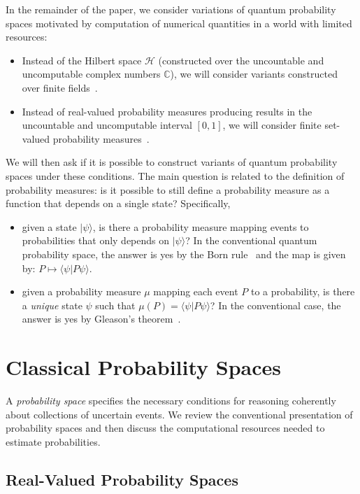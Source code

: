 \documentclass{article}
\theoremstyle{remark}
\newcommand{\Hilb}{\mathcal{H}}
\newcommand{\ket}[1]{|#1\rangle}
\newcommand{\ip}[2]{\langle #1 | #2 \rangle}
\begin{document}
In the remainder of the paper, we consider variations of quantum
probability spaces motivated by computation of numerical quantities in
a world with limited resources:
\begin{itemize}
\item Instead of the Hilbert space $\Hilb$ (constructed over the
  uncountable and uncomputable complex numbers $\mathbb{C}$), we will
  consider variants constructed over finite
  fields~\cite{HansonOrtizSabryEtAl2015,DQT2014,geometry2013}.
\item Instead of real-valued probability measures producing results in
  the uncountable and uncomputable interval $[0,1]$, we will consider
  finite set-valued probability measures~\cite{PuriRalescu1983}.
\end{itemize}
We will then ask if it is possible to construct variants of quantum
probability spaces under these conditions. The main question is
related to the definition of probability measures: is it possible to
still define a probability measure as a function that depends on a
single state? Specifically,
\begin{itemize}
\item given a state $\ket{\psi}$, is there a probability measure
  mapping events to probabilities that only depends on $\ket{\psi}$?
  In the conventional quantum probability space, the answer is yes by
  the Born rule~\cite{Born1983,Mermin2007} and the map is given by:
  $P \mapsto \ip{\psi}{P\psi}$.
\item given a probability measure $\mu$
  mapping each event $P$
  to a probability, is there a \emph{unique} state $\psi$
  such that $\mu(P)
  =
  \ip{\psi}{P\psi}$? In the conventional case, the answer is yes by
  Gleason's
  theorem~\cite{gleason1957,peres1995quantum,Redhead1987-REDINA}.
\end{itemize}

\section{Classical Probability Spaces}
  
A \emph{probability space} specifies the necessary conditions for
reasoning coherently about collections of uncertain events.  We review
the conventional presentation of probability spaces and then discuss
the computational resources needed to estimate probabilities.

\subsection{Real-Valued Probability Spaces}
\end{document}
